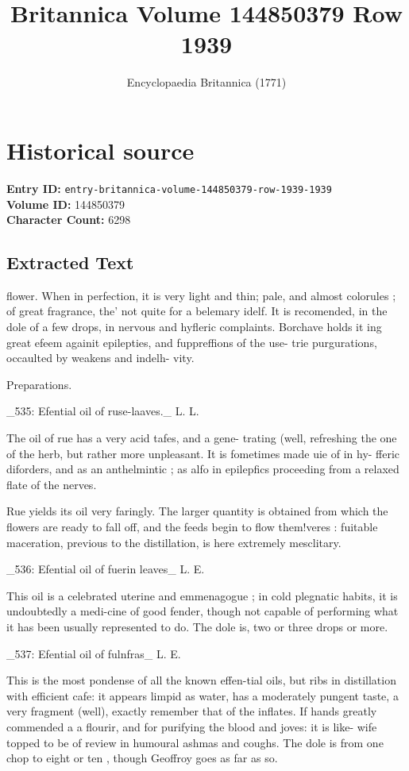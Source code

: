 \documentclass{article}
\title{Britannica Volume 144850379 Row 1939}
\date{Encyclopaedia Britannica (1771)}
\begin{document}
\maketitle

\section*{Historical source}
\textbf{Entry ID:} \texttt{entry-britannica-volume-144850379-row-1939-1939} \\
\textbf{Volume ID:} 144850379 \\
\textbf{Character Count:} 6298

\subsection*{Extracted Text}
flower. When in perfection, it is very light and thin; pale, and almost colorules ; of great fragrance, the’ not quite for a belemary idelf. It is recomended, in the dole of a few drops, in nervous and hyfleric complaints. Borchave holds it ing great efeem againit epilepties, and fuppreffions of the use- trie purgurations, occaulted by weakens and indelh- vity.

Preparations.

\_535: Efential oil of ruse-laaves.\_ L. L.

The oil of rue has a very acid tafes, and a gene- trating (well, refreshing the one of the herb, but rather more unpleasant. It is fometimes made uie of in hy- fferic diforders, and as an anthelmintic ; as alfo in epilepfics proceeding from a relaxed flate of the nerves.

Rue yields its oil very faringly. The larger quantity is obtained from which the flowers are ready to fall off, and the feeds begin to flow them!veres : fuitable maceration, previous to the distillation, is here extremely mesclitary.

\_536: Efential oil of fuerin leaves\_ L. E.

This oil is a celebrated uterine and emmenagogue ; in cold plegnatic habits, it is undoubtedly a medi-cine of good fender, though not capable of performing what it has been usually represented to do. The dole is, two or three drops or more.

\_537: Efential oil of fulnfras\_ L. E.

This is the most pondense of all the known effen-tial oils, but ribs in distillation with efficient cafe: it appears limpid as water, has a moderately pungent taste, a very fragment (well), exactly remember that of the inflates. If hands greatly commended a a flourir, and for purifying the blood and joves: it is like- wife topped to be of review in humoural ashmas and coughs. The dole is from one chop to eight or ten , though Geoffroy goes as far as so.
\end{document}
